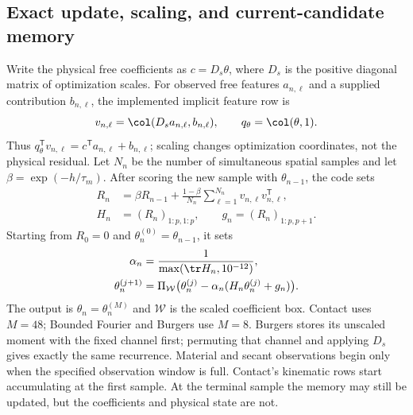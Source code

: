\subsection{Exact update, scaling, and current-candidate memory}
Write the physical free coefficients as $c=D_s\theta$, where $D_s$ is the
positive diagonal matrix of optimization scales. For observed free features
$a_{n,\ell}$ and a supplied contribution $b_{n,\ell}$, the implemented
implicit feature row is
\begin{equation}
 v_{n,\ell}=\col(D_sa_{n,\ell},b_{n,\ell}),\qquad
 q_\theta=\col(\theta,1).
 \label{eq:audit_channels}
\end{equation}
Thus $q_\theta^{\mathsf T}v_{n,\ell}=c^{\mathsf T}a_{n,\ell}+b_{n,\ell}$;
scaling changes optimization coordinates, not the physical residual.
Let $N_n$ be the number of simultaneous spatial samples and let
$\beta=\exp(-h/\tau_m)$. After scoring the new sample with $\theta_{n-1}$,
the code sets
\begin{align}
 R_n&=\beta R_{n-1}+\frac{1-\beta}{N_n}
       \sum_{\ell=1}^{N_n}v_{n,\ell}v_{n,\ell}^{\mathsf T},\\
 H_n&=(R_n)_{1:p,1:p},\qquad g_n=(R_n)_{1:p,p+1}.
\end{align}
Starting from $R_0=0$ and $\theta_n^{(0)}=\theta_{n-1}$, it sets
\begin{align}
 \alpha_n&=\frac{1}{\max(\tr H_n,10^{-12})},\\
 \theta_n^{(j+1)}&=\Pi_{\mathcal W}
 \bigl(\theta_n^{(j)}-\alpha_n(H_n\theta_n^{(j)}+g_n)\bigr).
 \label{eq:audit_exact_update}
\end{align}
The output is $\theta_n=\theta_n^{(M)}$ and $\mathcal W$ is the scaled
coefficient box. Contact uses $M=48$;
Bounded Fourier and Burgers use $M=8$. Burgers stores its unscaled moment with
the fixed channel first; permuting that channel and applying $D_s$ gives
exactly the same recurrence. Material and secant observations begin only
when the specified observation window is full. Contact's kinematic rows
start accumulating at the first sample. At the terminal sample the memory
may still be updated, but the coefficients and physical state are not.

